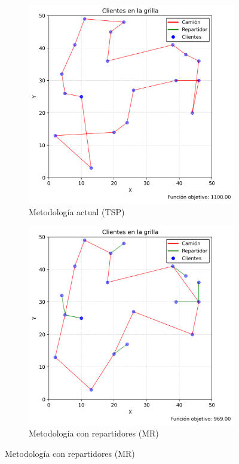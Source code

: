 \documentclass[10pt]{article}
\begin{document}
\begin{figure}[htbp]
	\centering
	\begin{subfigure}[b]{0.45\textwidth}
		\centering
		\includegraphics[width=\textwidth]{figuras/plano_uniforme_tsp_2.png}
		\caption{Metodología actual (TSP)}
		\label{fig:sub1}
	\end{subfigure}
	\hfill
	\begin{subfigure}[b]{0.45\textwidth}
		\centering
		\includegraphics[width=\textwidth]{figuras/plano_uniforme_repartidores_2.png}
		\caption{Metodología con repartidores (MR)}
		\label{fig:sub2}
	\end{subfigure}
	

\end{figure}
\end{document}
